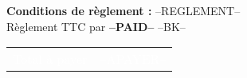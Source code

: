 \documentclass[a4paper, oneside, 10pt, french]{article}
\begin{document}
\begin{minipage}[t]{0.48\textwidth}
{\footnotesize \textbf{Conditions de règlement :} --REGLEMENT--}\\
{\footnotesize Règlement TTC par \textbf{--PAID--} --BK--}\\
\end{minipage}
\hspace{2mm}
\begin{minipage}[t]{0.50\textwidth}
\begin{flushright}
\begin{tabular}{p{4.5cm} r}
\rowcolor{violet}\textcolor{white}{Total à payer} &\textcolor{white}{--APAYER--} \\ 
\end{tabular} 
\end{flushright}
\end{minipage}
\end{document}
